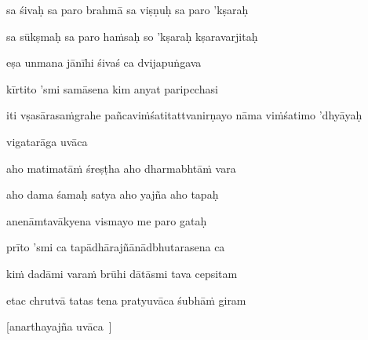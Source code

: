 sa śivaḥ sa paro brahmā sa viṣṇuḥ sa paro 'kṣaraḥ\thinspace{\dandab} \dontdisplaylinenum

sa sūkṣmaḥ sa paro ha\.msaḥ so 'kṣaraḥ kṣaravarjitaḥ \veg\dontdisplaylinenum

eṣa unmana jānīhi śivaś ca dvijapuṅgava\thinspace{\dandab} \dontdisplaylinenum

kīrtito 'smi samāsena kim anyat paripcchasi \veg\dontdisplaylinenum


\jump
\begin{center}
\ketdanda iti vṣasārasa\.mgrahe pañcavi\.mśatitattvanirṇayo nāma vi\.mśatimo 'dhyāyaḥ\ketdanda
\end{center}
\dontdisplaylinenum\vers 
\bekveg\szamveg\vfill\phpspagebreak\szam\bek{}
\thispagestyle{empty}


\vers


\jump\jump

vigatarāga uvāca~{\dandab}\dontdisplaylinenum 

aho matimatā\.m śreṣṭha aho dharmabhtā\.m vara\thinspace{\danda} \dontdisplaylinenum

aho dama śamaḥ satya aho yajña aho tapaḥ \veg\dontdisplaylinenum

anenāmtavākyena vismayo me paro gataḥ\thinspace{\dandab} \dontdisplaylinenum

prīto 'smi ca tapādhārajñānādbhutarasena ca \veg\dontdisplaylinenum

ki\.m dadāmi vara\.m brūhi dātāsmi tava cepsitam\thinspace{\dandab} \dontdisplaylinenum

etac chrutvā tatas tena pratyuvāca śubhā\.m giram \veg\dontdisplaylinenum

[anarthayajña uvāca~{\dandab}\dontdisplaylinenum ]

